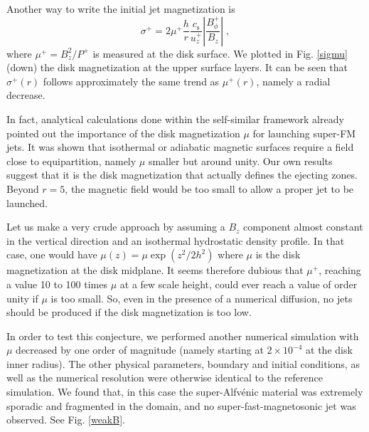 \documentclass{aa}
\begin{document}
Another way to write the initial jet magnetization is
\begin{equation}
\sigma^+= 2 \mu^+ \frac{h}{r} \frac{c_\mathrm{s}}{u_z^+} \left | \frac{B_\phi^+}{B_z} \right | \; ,
\end{equation}
where $\mu^+= B_z^2/P^+$ is measured at the disk surface. We plotted in Fig. \ref{sigmu} (down) the disk magnetization at the upper surface layers. It can be seen that $\sigma^+(r)$ follows
approximately the same trend as $\mu^+(r)$, namely a radial decrease.

 In fact, analytical calculations done within the self-similar framework already pointed out the importance of the disk magnetization $\mu$ for launching super-FM jets. It was shown that isothermal
 \citep{1995A&A...295..807F,1997A&A...319..340F} or adiabatic \citep{2000A&A...353.1115C} magnetic surfaces require a field close to equipartition, namely $\mu$ smaller but around unity. Our own
 results suggest that it is the disk magnetization that actually defines the ejecting zones. Beyond $r=5$, the magnetic field would be too small to allow a proper jet to be launched.

Let us make a very crude approach by assuming a $B_z$ component almost constant in the vertical direction and an isothermal hydrostatic density profile. In that case, one would have $\mu(z) = \mu
\exp(z^2/2h^2)$ where $\mu$ is the disk magnetization at the disk midplane. It seems therefore dubious that $\mu^+$, reaching a value 10 to 100 times $\mu$ at a few scale height, could ever reach a
value of order unity if $\mu$ is too small. So, even in the presence of a numerical diffusion, no jets should be produced if the disk magnetization is too low.

In order to test this conjecture, we performed another numerical simulation with $\mu$ decreased by one order of magnitude (namely starting at $2\times10^{-4}$ at the disk inner radius). The other
physical parameters, boundary and initial conditions, as well as the numerical resolution were otherwise identical to the reference simulation. We found that, in this case the super-Alfv\'enic
material was extremely sporadic and fragmented in the domain, and no super-fast-magnetosonic jet was observed. See Fig. \ref{weakB}.
\end{document}

